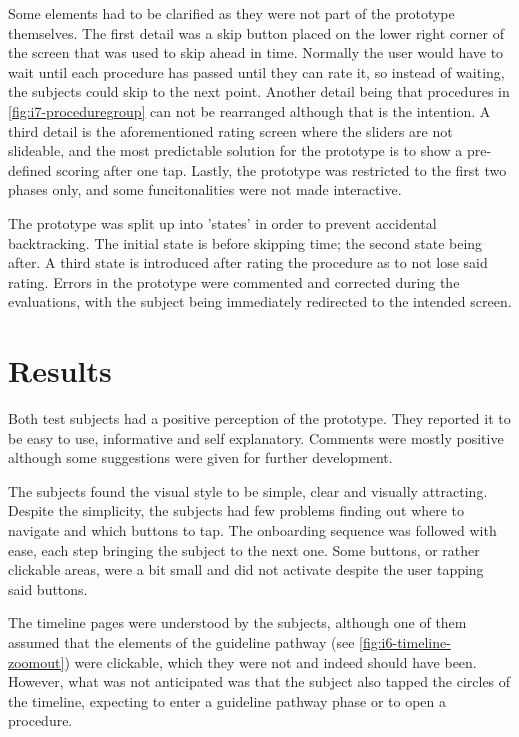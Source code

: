 Some elements had to be clarified as they were not part of the prototype themselves. The first detail was a skip button placed on the lower right corner of the screen that was used to skip ahead in time. Normally the user would have to wait until each procedure has passed until they can rate it, so instead of waiting, the subjects could skip to the next point. Another detail being that procedures in \autoref{fig:i7-proceduregroup} can not be rearranged although that is the intention. A third detail is the aforementioned rating screen where the sliders are not slideable, and the most predictable solution for the prototype is to show a pre-defined scoring after one tap. Lastly, the prototype was restricted to the first two phases only, and some funcitonalities were not made interactive.

The prototype was split up into 'states' in order to prevent accidental backtracking. The initial state is before skipping time; the second state being after. A third state is introduced after rating the procedure as to not lose said rating. Errors in the prototype were commented and corrected during the evaluations, with the subject being immediately redirected to the intended screen.

\section{Results}

Both test subjects had a positive perception of the prototype. They reported it to be easy to use, informative and self explanatory. Comments were mostly positive although some suggestions were given for further development.

The subjects found the visual style to be simple, clear and visually attracting. Despite the simplicity, the subjects had few problems finding out where to navigate and which buttons to tap. The onboarding sequence was followed with ease, each step bringing the subject to the next one. Some buttons, or rather clickable areas, were a bit small and did not activate despite the user tapping said buttons.

The timeline pages were understood by the subjects, although one of them assumed that the elements of the guideline pathway (see \autoref{fig:i6-timeline-zoomout}) were clickable, which they were not and indeed should have been. However, what was not anticipated was that the subject also tapped the circles of the timeline, expecting to enter a guideline pathway phase or to open a procedure.

